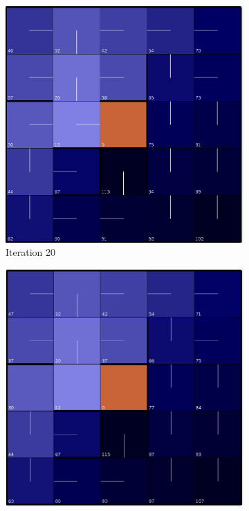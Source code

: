 \documentclass[letterpaper]{article}
\begin{document}
\begin{figure}
\begin{subfigure}[t]{.18\textwidth}
			\includegraphics[width=\linewidth]{images/small_vi_20}
			\caption{Iteration 20}
		\end{subfigure}
		\begin{subfigure}[t]{.18\textwidth}
			\centering
			\includegraphics[width=\linewidth]{images/small_vi_30}

\end{subfigure}
\end{figure}
\end{document}
